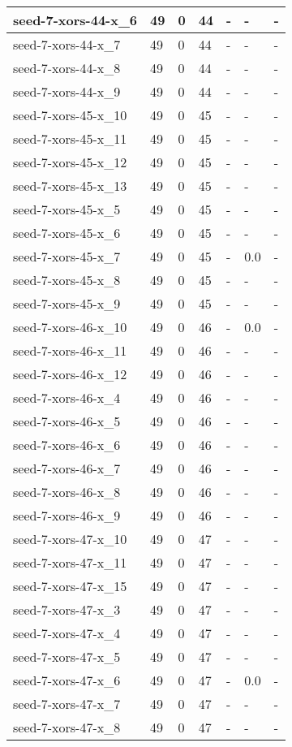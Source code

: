 \begin{scriptsize}
\begin{longtable}{|p{5cm}|l|l|l|l|l|l|}
seed-7-xors-44-x\_6&49&0&44&-&-&- \\ \hline 
seed-7-xors-44-x\_7&49&0&44&-&-&- \\ \hline 
seed-7-xors-44-x\_8&49&0&44&-&-&- \\ \hline 
seed-7-xors-44-x\_9&49&0&44&-&-&- \\ \hline 
seed-7-xors-45-x\_10&49&0&45&-&-&- \\ \hline 
seed-7-xors-45-x\_11&49&0&45&-&-&- \\ \hline 
seed-7-xors-45-x\_12&49&0&45&-&-&- \\ \hline 
seed-7-xors-45-x\_13&49&0&45&-&-&- \\ \hline 
seed-7-xors-45-x\_5&49&0&45&-&-&- \\ \hline 
seed-7-xors-45-x\_6&49&0&45&-&-&- \\ \hline 
seed-7-xors-45-x\_7&49&0&45&-&0.0&- \\ \hline 
seed-7-xors-45-x\_8&49&0&45&-&-&- \\ \hline 
seed-7-xors-45-x\_9&49&0&45&-&-&- \\ \hline 
seed-7-xors-46-x\_10&49&0&46&-&0.0&- \\ \hline 
seed-7-xors-46-x\_11&49&0&46&-&-&- \\ \hline 
seed-7-xors-46-x\_12&49&0&46&-&-&- \\ \hline 
seed-7-xors-46-x\_4&49&0&46&-&-&- \\ \hline 
seed-7-xors-46-x\_5&49&0&46&-&-&- \\ \hline 
seed-7-xors-46-x\_6&49&0&46&-&-&- \\ \hline 
seed-7-xors-46-x\_7&49&0&46&-&-&- \\ \hline 
seed-7-xors-46-x\_8&49&0&46&-&-&- \\ \hline 
seed-7-xors-46-x\_9&49&0&46&-&-&- \\ \hline 
seed-7-xors-47-x\_10&49&0&47&-&-&- \\ \hline 
seed-7-xors-47-x\_11&49&0&47&-&-&- \\ \hline 
seed-7-xors-47-x\_15&49&0&47&-&-&- \\ \hline 
seed-7-xors-47-x\_3&49&0&47&-&-&- \\ \hline 
seed-7-xors-47-x\_4&49&0&47&-&-&- \\ \hline 
seed-7-xors-47-x\_5&49&0&47&-&-&- \\ \hline 
seed-7-xors-47-x\_6&49&0&47&-&0.0&- \\ \hline 
seed-7-xors-47-x\_7&49&0&47&-&-&- \\ \hline 
seed-7-xors-47-x\_8&49&0&47&-&-&- \\ \hline 

\end{longtable}
\end{scriptsize}
